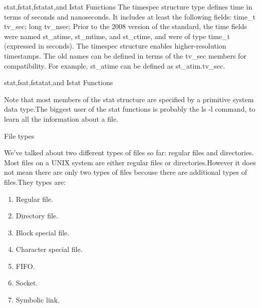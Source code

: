 \documentclass{beamer}
\begin{document}
\begin{frame}[t]{stat,fstat,fstatat,and Istat Functions}
The timespec structure type defines time in terms of seconds and nanoseconds. It
includes at least the following fields:
time\_t tv\_sec;
long tv\_nsec;
Prior to the 2008 version of the standard, the time fields were named st\_atime, st\_mtime,
and st\_ctime, and were of type time\_t (expressed in seconds). The timespec structure
enables higher-resolution timestamps. The old names can be defined in terms of the tv\_sec
members for compatibility. For example, st\_atime can be defined as st\_atim.tv\_sec.
\end{frame}



\begin{frame}[t]{stat,fsat,fstatat,and Istat Functions}\vspace*{4pt}

Note that most members of the stat structure are specified by a primitive system data type.The biggest user of the stat functions is probably the ls -l command, to learn all the information about a file.






\end{frame}
\begin{frame}[t]{File types}\vspace*{4pt}

We’ve talked about two different types of files so far: regular files and directories. Most files on a UNIX system are either regular files or directories.However it does not mean there are only two types of files becouse there are additional  types of files.They types are:
\begin{enumerate}
	\item Regular file.
	\item Directory file.
	\item Block special file.
	\item Character special file.
	\item FIFO.
	\item Socket.
	\item Symbolic link.
\end{enumerate}
 
 
 


\end{frame}
\end{document}
